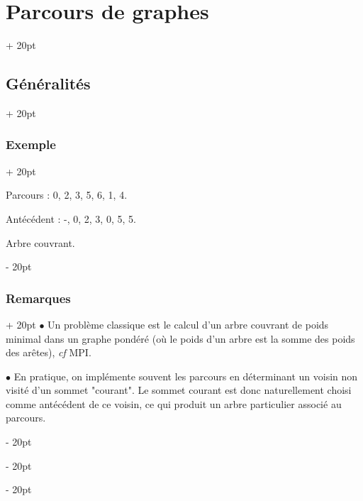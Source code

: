 \documentclass[a4paper, 12pt, twoside]{article}
\renewcommand{\emph}{\textcolor{ff4500}}
\newcommand{\ind}[1][20pt]{\advance\leftskip + #1}
\newcommand{\deind}[1][20pt]{\advance\leftskip - #1}
\newenvironment{indt}[2][20pt]{#2 \par \ind[#1]}{\par \deind} %
\begin{document}
\begin{indt}{\section{Parcours de graphes}}
\begin{indt}{\subsection{Généralités}}
            \begin{indt}{\subsubsection{Exemple}}
                \begin{center}
                \end{center}

                Parcours : 0, 2, 3, 5, 6, 1, 4.

                Antécédent : -, 0, 2, 3, 0, 5, 5.

                \emph{Arbre couvrant}.
            \end{indt}

            \vspace{12pt}
            
            \begin{indt}{\subsubsection{Remarques}}
                $\bullet$ Un problème classique est le calcul d'un arbre couvrant de poids minimal dans un graphe pondéré (où le poids d'un arbre est la somme des poids des arêtes), \textit{cf} MPI.

                $\bullet$ En pratique, on implémente souvent les parcours en déterminant un voisin non visité d'un sommet "courant". Le sommet courant est donc naturellement choisi comme antécédent de ce voisin, ce qui produit un arbre particulier associé au parcours.
            \end{indt}


\end{indt}
\end{indt}
\end{document}
